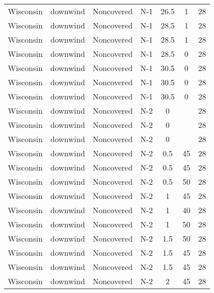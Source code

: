 \documentclass{article}
\begin{document}
\begin{longtable}[c]{ccccccc}
Wisconsin & downwind  & Noncovered & N-1             & 26.5         & 1           & 28  \\
Wisconsin & downwind  & Noncovered & N-1             & 28.5         & 1           & 28  \\
Wisconsin & downwind  & Noncovered & N-1             & 28.5         & 1           & 28  \\
Wisconsin & downwind  & Noncovered & N-1             & 28.5         & 0           & 28  \\
Wisconsin & downwind  & Noncovered & N-1             & 30.5         & 0           & 28  \\
Wisconsin & downwind  & Noncovered & N-1             & 30.5         & 0           & 28  \\
Wisconsin & downwind  & Noncovered & N-1             & 30.5         & 0           & 28  \\
Wisconsin & downwind  & Noncovered & N-2             & 0            &             & 28  \\
Wisconsin & downwind  & Noncovered & N-2             & 0            &             & 28  \\
Wisconsin & downwind  & Noncovered & N-2             & 0            &             & 28  \\
Wisconsin & downwind  & Noncovered & N-2             & 0.5          & 45          & 28  \\
Wisconsin & downwind  & Noncovered & N-2             & 0.5          & 45          & 28  \\
Wisconsin & downwind  & Noncovered & N-2             & 0.5          & 50          & 28  \\
Wisconsin & downwind  & Noncovered & N-2             & 1            & 45          & 28  \\
Wisconsin & downwind  & Noncovered & N-2             & 1            & 40          & 28  \\
Wisconsin & downwind  & Noncovered & N-2             & 1            & 50          & 28  \\
Wisconsin & downwind  & Noncovered & N-2             & 1.5          & 50          & 28  \\
Wisconsin & downwind  & Noncovered & N-2             & 1.5          & 45          & 28  \\
Wisconsin & downwind  & Noncovered & N-2             & 1.5          & 45          & 28  \\
Wisconsin & downwind  & Noncovered & N-2             & 2            & 45          & 28  \\

\end{longtable}
\end{document}
